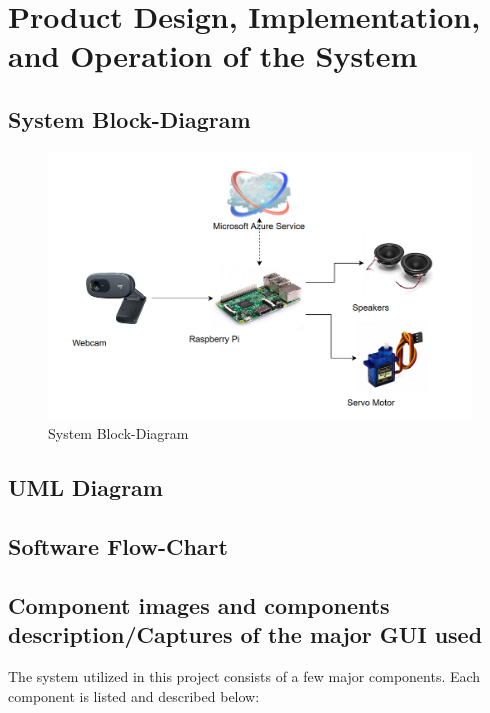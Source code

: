 \documentclass[a4paper,12pt]{article}
\begin{document}
\section{Product Design, Implementation, and Operation of the System}

\subsection{System Block-Diagram}
\begin{figure}[ht]
    \centering
    \includegraphics[width = \linewidth]{../images/BlockDiagram.png}
    
    \caption{System Block-Diagram}
\end{figure}

\subsection{UML Diagram}
\subsection{Software Flow-Chart}

\subsection{Component images and components description/Captures of the major GUI used}

The system utilized in this project consists of a few major components. Each component is listed and described below:
\end{document}
